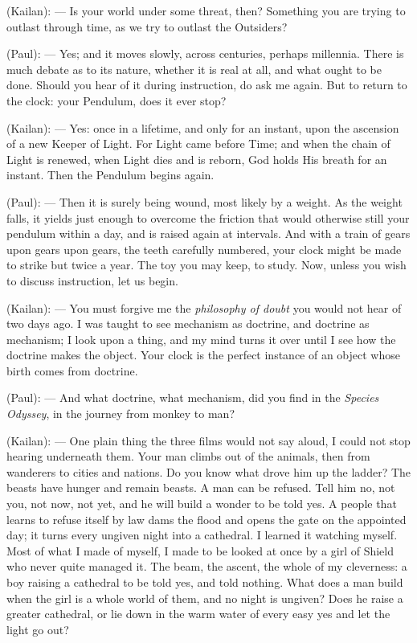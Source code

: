 \begin{room}
(Kailan): --- Is your world under some threat, then? Something you are trying to outlast through time, as we try to outlast the Outsiders?

(Paul): --- Yes; and it moves slowly, across centuries, perhaps millennia. There is much debate as to its nature, whether it is real at all, and what ought to be done. Should you hear of it during instruction, do ask me again. But to return to the clock: your Pendulum, does it ever stop?

(Kailan): --- Yes: once in a lifetime, and only for an instant, upon the ascension of a new Keeper of Light. For Light came before Time; and when the chain of Light is renewed, when Light dies and is reborn, God holds His breath for an instant. Then the Pendulum begins again.

(Paul): --- Then it is surely being wound, most likely by a weight. As the weight falls, it yields just enough to overcome the friction that would otherwise still your pendulum within a day, and is raised again at intervals. And with a train of gears upon gears upon gears, the teeth carefully numbered, your clock might be made to strike but twice a year. The toy you may keep, to study. Now, unless you wish to discuss instruction, let us begin.

(Kailan): --- You must forgive me the \textit{philosophy of doubt} you would not hear of two days ago. I was taught to see mechanism as doctrine, and doctrine as mechanism; I look upon a thing, and my mind turns it over until I see how the doctrine makes the object. Your clock is the perfect instance of an object whose birth comes from doctrine.

(Paul): --- And what doctrine, what mechanism, did you find in the \textit{Species Odyssey}, in the journey from monkey to man?

(Kailan): --- One plain thing the three films would not say aloud, I could not stop hearing underneath them. Your man climbs out of the animals, then from wanderers to cities and nations. Do you know what drove him up the ladder? The beasts have hunger and remain beasts. A man can be refused. Tell him no, not you, not now, not yet, and he will build a wonder to be told yes. A people that learns to refuse itself by law dams the flood and opens the gate on the appointed day; it turns every ungiven night into a cathedral. I learned it watching myself. Most of what I made of myself, I made to be looked at once by a girl of Shield who never quite managed it. The beam, the ascent, the whole of my cleverness: a boy raising a cathedral to be told yes, and told nothing. What does a man build when the girl is a whole world of them, and no night is ungiven? Does he raise a greater cathedral, or lie down in the warm water of every easy yes and let the light go out?


\end{room}
